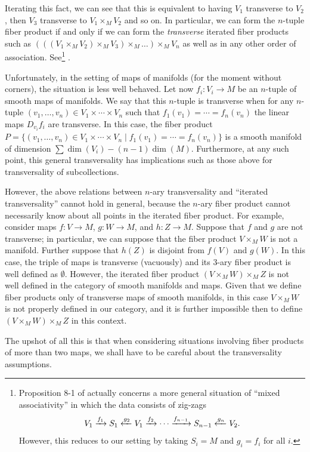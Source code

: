 \begin{remark}
	Iterating this fact, we can see that this is equivalent to having $V_1$ transverse to $V_2$, then $V_3$ transverse to $V_1\times_MV_2$ and so on.
	In particular, we can form the $n$-tuple fiber product if and only if we can form the \textit{transverse} iterated fiber products such as $(((V_1\times_MV_2)\times_M V_3)\times_M\ldots)\times_M V_n$ as well as in any other order of association.
 	See\footnote{Proposition 8-1 of \cite{RamBas09} actually concerns a more general situation of ``mixed associativity'' in which the data consists of zig-zags
	$$V_1\xrightarrow{f_1}S_1\xleftarrow{g_2}V_1\xrightarrow{f_2}\cdots\xrightarrow{f_{n-1}}S_{n-1}\xleftarrow{g_n}V_2.$$
	However, this reduces to our setting by taking $S_i=M$ and $g_i=f_i$ for all $i$.} \cite[Propositions~4-9 and 8-1]{RamBas09}.

	Unfortunately, in the setting of maps of manifolds (for the moment without corners), the situation is less well behaved.
	Let now $f_i \colon V_i\to M$ be an $n$-tuple of smooth maps of manifolds.
	We say that this $n$-tuple is transverse when for any $n$-tuple $(v_1,\ldots, v_n)\in V_1\times\cdots \times V_n$ such that $f_1(v_1)=\cdots=f_n(v_n)$ the linear maps $D_{v_i}f_i$ are transverse.
	In this case, the fiber product $P=\{(v_1,\ldots, v_n)\in V_1\times\cdots \times V_n\mid f_1(v_1)=\cdots=f_n(v_n)\}$ is a smooth manifold of dimension $\sum\dim(V_i)-(n-1)\dim(M)$.
	Furthermore, at any such point, this general transversality has implications such as those above for transversality of subcollections.

	However, the above relations between $n$-ary transversality and ``iterated transversality'' cannot hold in general, because the $n$-ary fiber product cannot necessarily know about all points in the iterated fiber product.
	For example, consider maps $f \colon V\to M$, $g \colon W\to M$, and $h \colon Z\to M$.
	Suppose that $f$ and $g$ are not transverse; in particular, we can suppose that the fiber product $V\times_MW$ is not a manifold.
	Further suppose that $h(Z)$ is disjoint from $f(V)$ and $g(W)$.
	In this case, the triple of maps is transverse (vacuously) and its 3-ary fiber product is well defined as $\emptyset$.
	However, the iterated fiber product $(V\times_MW)\times_M Z$ is not well defined in the category of smooth manifolds and maps.
	Given that we define fiber products only of transverse maps of smooth manifolds, in this case $V\times_M W$ is not properly defined in our category, and it is further impossible then to define $(V\times_MW)\times_M Z$ in this context.

	The upshot of all this is that when considering situations involving fiber products of more than two maps, we shall have to be careful about the transversality assumptions.
\end{remark}

